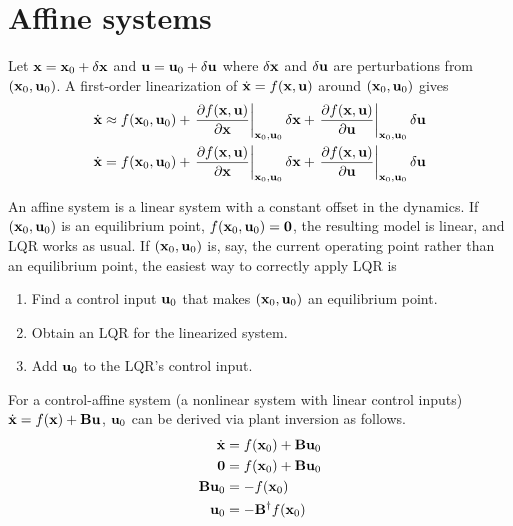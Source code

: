 \section{Affine systems}

Let $\mathbf{x} = \mathbf{x}_0 + \delta\mathbf{x}$ and
$\mathbf{u} = \mathbf{u}_0 + \delta\mathbf{u}$ where $\delta\mathbf{x}$ and $\delta\mathbf{u}$
are perturbations from $(\mathbf{x}_0, \mathbf{u}_0)$. A first-order linearization of
$\dot{\mathbf{x}} = f(\mathbf{x}, \mathbf{u})$ around $(\mathbf{x}_0, \mathbf{u}_0)$ gives
\begin{align*}
  \dot{\mathbf{x}} &\approx f(\mathbf{x}_0, \mathbf{u}_0) +
    \left.\frac{\partial f(\mathbf{x}, \mathbf{u})}{\partial \mathbf{x}}
    \right|_{\mathbf{x}_0, \mathbf{u}_0}\delta\mathbf{x} +
    \left.\frac{\partial f(\mathbf{x}, \mathbf{u})}{\partial \mathbf{u}}
    \right|_{\mathbf{x}_0, \mathbf{u}_0}\delta\mathbf{u} \\
  \dot{\mathbf{x}} &= f(\mathbf{x}_0, \mathbf{u}_0) +
    \left.\frac{\partial f(\mathbf{x}, \mathbf{u})}{\partial \mathbf{x}}
    \right|_{\mathbf{x}_0, \mathbf{u}_0}\delta\mathbf{x} +
    \left.\frac{\partial f(\mathbf{x}, \mathbf{u})}{\partial \mathbf{u}}
    \right|_{\mathbf{x}_0, \mathbf{u}_0}\delta\mathbf{u} \\
\end{align*}

An affine system is a linear system with a constant offset in the dynamics. If
$(\mathbf{x}_0, \mathbf{u}_0)$ is an equilibrium point,
$f(\mathbf{x}_0, \mathbf{u}_0) = \mathbf{0}$, the resulting \gls{model} is linear, and
LQR works as usual. If $(\mathbf{x}_0, \mathbf{u}_0)$ is, say, the current operating
point rather than an equilibrium point, the easiest way to correctly apply LQR
is
\begin{enumerate}
  \item Find a control input $\mathbf{u}_0$ that makes $(\mathbf{x}_0, \mathbf{u}_0)$ an
    equilibrium point.
  \item Obtain an LQR for the linearized system.
  \item Add $\mathbf{u}_0$ to the LQR's control input.
\end{enumerate}

For a control-affine \gls{system} (a nonlinear \gls{system} with linear control
inputs) $\dot{\mathbf{x}} = f(\mathbf{x}) + \mathbf{B}\mathbf{u}$, $\mathbf{u}_0$ can be
derived via plant inversion as follows.
\begin{align}
  \dot{\mathbf{x}} &= f(\mathbf{x}_0) + \mathbf{B}\mathbf{u}_0 \nonumber \\
  \mathbf{0} &= f(\mathbf{x}_0) + \mathbf{B}\mathbf{u}_0 \nonumber \\
  \mathbf{B}\mathbf{u}_0 &= -f(\mathbf{x}_0) \nonumber \\
  \mathbf{u}_0 &= -\mathbf{B}^\dagger f(\mathbf{x}_0)
\end{align}

